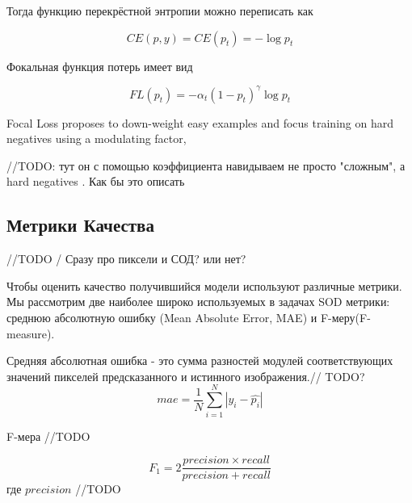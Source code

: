 Тогда функцию перекрёстной энтропии можно переписать как

\begin{equation}
    CE(p,y) = CE(p_t) = -\log{p_t}
\end{equation}

Фокальная функция потерь имеет вид

\begin{equation}
    FL(p_t) = -\alpha_t(1-p_t)^{\gamma}\log{p_t}
\end{equation}
 

Focal Loss proposes to down-weight easy examples and focus
training on hard negatives using a modulating factor,

//TODO: тут он с помощью коэффициента навидываем не просто "сложным", 
а hard negatives . Как бы это описать 

\subsection{Метрики Качества}

//TODO / Сразу про пиксели и СОД? или нет? 

Чтобы оценить качество получившийся модели используют различные метрики. Мы рассмотрим 
две наиболее широко используемых в задачах SOD метрики: среднюю абсолютную ошибку (Mean Absolute Error, MAE) и F-меру(F-measure).

Средняя абсолютная ошибка - это сумма разностей модулей соответствующих значений пикселей предсказанного и истинного изображения.// TODO?
\begin{equation}
    mae = \frac{1}{N}\sum_{i=1}^N|y_i - \hat{p_i}|
\end{equation}

F-мера //TODO


\begin{equation}
    F_1 = 2\frac{precision \times recall}{precision + recall}
\end{equation}
где $precision$ //TODO